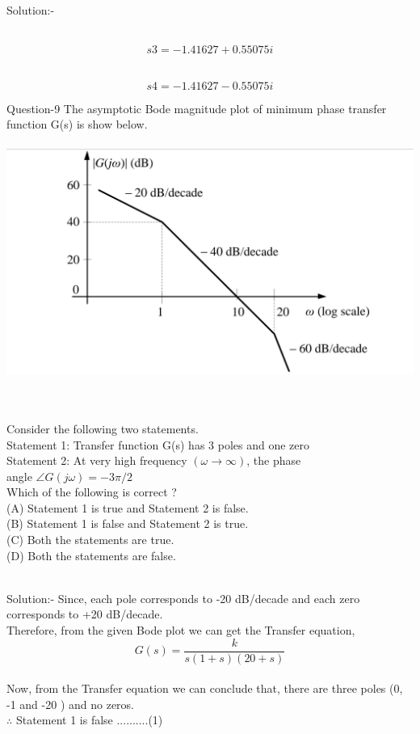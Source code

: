 \documentclass[journal,12pt,twocolumn]{IEEEtran}
\begin{document}
\begin{frame}{Solution:- }
\begin{frame}{}
\\$$s3=−1.41627+0.55075i$$

\\$$s4=−1.41627−0.55075i$$
\end{frame}

\begin{frame}{Question-9 }
The asymptotic Bode magnitude plot of  minimum phase transfer function
G(s) is show below.
\\\\
\includegraphics[scale = .12]{./figs/pppp.JPG}
\end{frame}

\begin{frame}
\\\\  
Consider the following two statements.\\
\quad Statement 1: Transfer function G(s) has 3 poles and one zero \\
\quad Statement 2: At very high frequency $(\omega \to \infty)$, the phase \\  \quad \quad \quad \quad \quad \quad angle $ \angle G(j\omega)=-3\pi/2$ \\ 
Which of the following is correct ? \\
(A) Statement 1 is true and Statement 2 is false.\\
(B) Statement 1 is false and Statement 2 is true.\\
(C) Both the statements are true.\\
(D) Both the statements are false.
\\\\
\end{frame}


\begin{frame}{Solution:- }
Since, each pole corresponds to -20 dB/decade  
and each zero corresponds to +20 dB/decade.\\
Therefore, from the given Bode plot we can get the Transfer equation,\\
\[ G(s) = \frac{k}{s(1+s)(20+s)} \]
\\
Now, from the Transfer equation we can conclude that,
there are three poles (0, -1 and -20 ) and no zeros.\\
\quad \quad \quad $\therefore$ Statement 1 is false \quad \quad \quad ..........(1)





\end{frame}
\end{frame}
\end{document}
